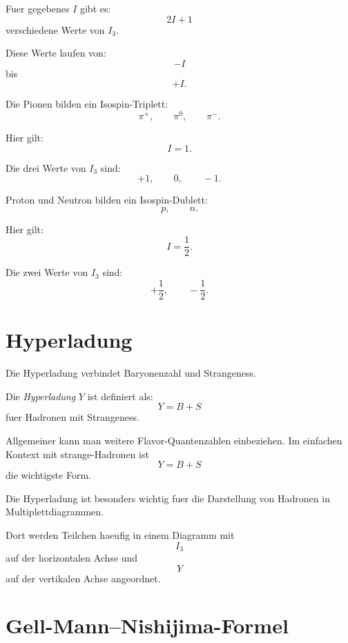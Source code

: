 \begin{conceptbox}
Fuer gegebenes $I$ gibt es:
\[
    2I+1
\]
verschiedene Werte von $I_3$.

Diese Werte laufen von:
\[
    -I
\]
bis
\[
    +I.
\]
\end{conceptbox}

\begin{examplebox}
Die Pionen bilden ein Isospin-Triplett:
\[
    \pi^+,\qquad \pi^0,\qquad \pi^-.
\]

Hier gilt:
\[
    I=1.
\]

Die drei Werte von $I_3$ sind:
\[
    +1,\qquad 0,\qquad -1.
\]
\end{examplebox}

\begin{examplebox}
Proton und Neutron bilden ein Isospin-Dublett:
\[
    p,\qquad n.
\]

Hier gilt:
\[
    I=\frac{1}{2}.
\]

Die zwei Werte von $I_3$ sind:
\[
    +\frac{1}{2},
    \qquad
    -\frac{1}{2}.
\]
\end{examplebox}

\section{Hyperladung}

Die Hyperladung verbindet Baryonenzahl und Strangeness.

\begin{definitionbox}
Die \emph{Hyperladung} $Y$ ist definiert als:
\[
    Y = B + S
\]
fuer Hadronen mit Strangeness.
\end{definitionbox}

\begin{notebox}
Allgemeiner kann man weitere Flavor-Quantenzahlen einbeziehen.
Im einfachen Kontext mit strange-Hadronen ist
\[
    Y=B+S
\]
die wichtigste Form.
\end{notebox}

\begin{conceptbox}
Die Hyperladung ist besonders wichtig fuer die Darstellung von Hadronen in
Multiplettdiagrammen.

Dort werden Teilchen haeufig in einem Diagramm mit
\[
    I_3
\]
auf der horizontalen Achse und
\[
    Y
\]
auf der vertikalen Achse angeordnet.
\end{conceptbox}

\section{Gell-Mann--Nishijima-Formel}

